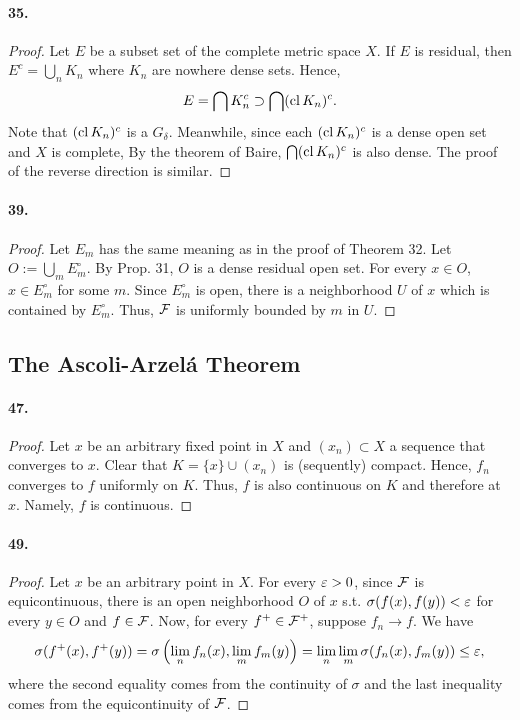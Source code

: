 \paragraph{35.}
\begin{proof}
  Let $E$ be a subset set of the complete metric space $X$. If $E$ is residual,
  then $E^c = \bigcup_n K_n$ where $K_n$ are nowhere dense sets. Hence, 
  \[
    E = \bigcap K_n^c \supset \bigcap (\operatorname{cl} K_n)^c.
  \]
  Note that $(\operatorname{cl} K_n)^c$ is a $G_\delta$. Meanwhile, since each $(\operatorname{cl} K_n)^c$
  is a dense open set and $X$ is complete, By the theorem of Baire, 
  $\bigcap (\operatorname{cl} K_n)^c$ is also dense. The proof of the reverse direction is
  similar.
\end{proof}

\paragraph{39.}
\begin{proof}
  Let $E_m$ has the same meaning as in the proof of Theorem 32. Let $O := 
  \bigcup_m E_m^\circ$. By Prop. 31, $O$ is a dense residual open set. For
  every $x\in O$, $x \in E_m^\circ$ for some $m$. Since $E_m^\circ$ is open,
  there is a neighborhood $U$ of $x$ which is contained by $E_m^\circ$. Thus,
  $\mathcal{F}$ is uniformly bounded by $m$ in $U$.
\end{proof}


\setcounter{subsection}{9}
\subsection{The Ascoli-Arzel\'{a} Theorem}
\paragraph{47.}
\begin{proof}
  Let $x$ be an arbitrary fixed point in $X$ and $(x_n)\subset X$ a sequence
  that converges to $x$. Clear that $K = \{x\}\cup(x_n)$ is (sequently)
  compact. Hence, $f_n$ converges to $f$ uniformly on $K$. Thus, $f$ is also
  continuous on $K$ and therefore at $x$. Namely, $f$ is continuous. 
\end{proof}

\paragraph{49.}
\begin{proof}
  Let $x$ be an arbitrary point in $X$. For every $\varepsilon > 0$, since $\mathcal{F}$
  is equicontinuous, there is an open neighborhood $O$ of $x$ s.t. 
  $\sigma(f(x), f(y)) < \varepsilon$ for every $y\in O$ and $f\in\mathcal{F}$. Now, for
  every $f^+\in \mathcal{F}^+$, suppose $f_n \to f$. We have
  \[
    \sigma(f^+(x), f^+(y)) 
    = \sigma\left(\lim_n f_n(x), \lim_m f_m(y)\right) 
    = \lim_n\lim_m \sigma(f_n(x), f_m(y)) \le \varepsilon,
  \]
  where the second equality comes from the continuity of $\sigma$ and the last
  inequality comes from the equicontinuity of $\mathcal{F}$.
\end{proof}

